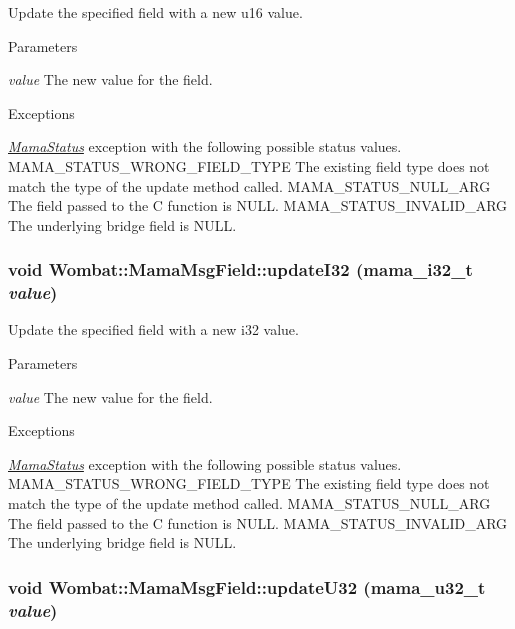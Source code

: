 Update the specified field with a new u16 value. 
\begin{DoxyParams}{Parameters}
\item[{\em value}]The new value for the field.\end{DoxyParams}

\begin{DoxyExceptions}{Exceptions}
\item[{\em \hyperlink{classWombat_1_1MamaStatus}{MamaStatus}}]exception with the following possible status values. MAMA\_\-STATUS\_\-WRONG\_\-FIELD\_\-TYPE The existing field type does not match the type of the update method called. MAMA\_\-STATUS\_\-NULL\_\-ARG The field passed to the C function is NULL. MAMA\_\-STATUS\_\-INVALID\_\-ARG The underlying bridge field is NULL. \end{DoxyExceptions}
\hypertarget{classWombat_1_1MamaMsgField_ab8021b43970e4ebfc70a18ec3eab9d60}{
\subsubsection[{updateI32}]{\setlength{\rightskip}{0pt plus 5cm}void Wombat::MamaMsgField::updateI32 (mama\_\-i32\_\-t {\em value})}}
\label{classWombat_1_1MamaMsgField_ab8021b43970e4ebfc70a18ec3eab9d60}


Update the specified field with a new i32 value. 
\begin{DoxyParams}{Parameters}
\item[{\em value}]The new value for the field.\end{DoxyParams}

\begin{DoxyExceptions}{Exceptions}
\item[{\em \hyperlink{classWombat_1_1MamaStatus}{MamaStatus}}]exception with the following possible status values. MAMA\_\-STATUS\_\-WRONG\_\-FIELD\_\-TYPE The existing field type does not match the type of the update method called. MAMA\_\-STATUS\_\-NULL\_\-ARG The field passed to the C function is NULL. MAMA\_\-STATUS\_\-INVALID\_\-ARG The underlying bridge field is NULL. \end{DoxyExceptions}
\hypertarget{classWombat_1_1MamaMsgField_a4b504118f928eac92537089916a6642c}{
\subsubsection[{updateU32}]{\setlength{\rightskip}{0pt plus 5cm}void Wombat::MamaMsgField::updateU32 (mama\_\-u32\_\-t {\em value})}}
\label{classWombat_1_1MamaMsgField_a4b504118f928eac92537089916a6642c}



